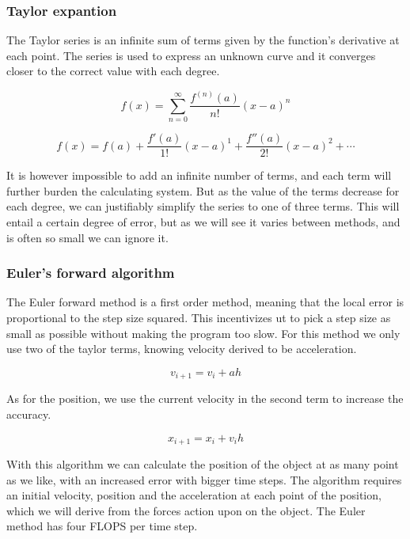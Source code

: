 \documentclass[10pt]{article}
\begin{document}
\begin{multicols}{2}
\subsubsection{Taylor expantion}
The Taylor series is an infinite sum of terms given by the function's
derivative at each point. The series is used to express an unknown
curve and it converges closer to the correct value with each degree. 

\begin{equation}
   f(x) =  \sum_{n=0}^\infty\frac{f^{(n)}(a)}{n!}(x-a)^n
\end{equation}

\begin{equation}
    f(x) = f(a)+ \frac{f'(a)}{1!}(x-a)^1+\frac{f''(a)}{2!}(x-a)^2+\cdots
\end{equation}

It is however impossible to add an infinite number of terms, and each term
will further burden the calculating system. But as the value of the terms
decrease for each degree, we can justifiably simplify the series to one of
three terms. This will entail a certain degree of error, but as we will see
it varies between methods, and is often so small we can ignore it.

\subsubsection{Euler's forward algorithm}
The Euler forward method is a first order method, meaning that the local
error is proportional to the step size squared. This incentivizes ut to
pick a step size as small as possible without making the program too slow.
For this method we only use two of the taylor terms, knowing velocity
derived to be acceleration.  

\begin{equation}
    v_{i+1} = v_i +ah
\end{equation}

As for the position, we use the current velocity in the second term to
increase the accuracy.

\begin{equation}
    x_{i+1} = x_i +v_{i}h
\end{equation}

With this algorithm we can calculate the position of the object at as many
point as we like, with an increased error with bigger time steps. The
algorithm requires an initial velocity, position and the acceleration at
each point of the position, which we will derive from the forces action
upon on the object. The Euler method has four FLOPS per time step.\\


\end{multicols}
\end{document}
